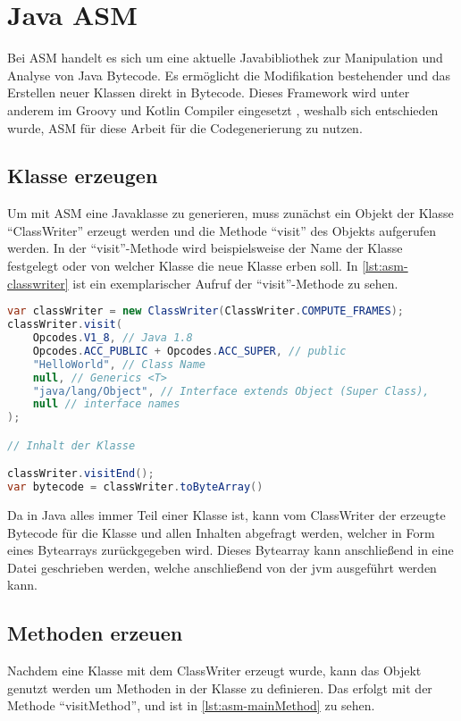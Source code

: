 \section{Java ASM}
Bei ASM handelt es sich um eine aktuelle Javabibliothek zur Manipulation und Analyse von Java Bytecode. Es ermöglicht die Modifikation bestehender und das Erstellen neuer Klassen direkt in Bytecode. Dieses Framework wird unter anderem im Groovy und Kotlin Compiler eingesetzt \cite{Bruneton2022}, weshalb sich entschieden wurde, ASM für diese Arbeit für die Codegenerierung zu nutzen.

\subsection{Klasse erzeugen} \label{subsec:asm-classwriter}
Um mit ASM eine Javaklasse zu generieren, muss zunächst ein Objekt der Klasse \enquote{ClassWriter} erzeugt werden und die Methode \enquote{visit} des Objekts aufgerufen werden. In der \enquote{visit}-Methode wird beispielsweise der Name der Klasse festgelegt oder von welcher Klasse die neue Klasse erben soll. In \cref{lst:asm-classwriter} ist ein exemplarischer Aufruf der \enquote{visit}-Methode zu sehen.

\begin{lstlisting}[language=Java, caption=Erzeugung und Nutzung eines ClassWriters, label={lst:asm-classwriter}]
var classWriter = new ClassWriter(ClassWriter.COMPUTE_FRAMES);
classWriter.visit(
	Opcodes.V1_8, // Java 1.8
	Opcodes.ACC_PUBLIC + Opcodes.ACC_SUPER, // public
	"HelloWorld", // Class Name
	null, // Generics <T>
	"java/lang/Object", // Interface extends Object (Super Class),
	null // interface names
);

// Inhalt der Klasse

classWriter.visitEnd();
var bytecode = classWriter.toByteArray()

\end{lstlisting}

Da in Java alles immer Teil einer Klasse ist, kann vom ClassWriter der erzeugte Bytecode für die Klasse und allen Inhalten abgefragt werden, welcher in Form eines Bytearrays zurückgegeben wird. Dieses Bytearray kann anschließend in eine Datei geschrieben werden, welche anschließend von der \ac{jvm} ausgeführt werden kann.

\subsection{Methoden erzeuen}
Nachdem eine Klasse mit dem ClassWriter erzeugt wurde, kann das Objekt genutzt werden um Methoden in der Klasse zu definieren. Das erfolgt mit der Methode \enquote{visitMethod}, und ist in \cref{lst:asm-mainMethod} zu sehen.

